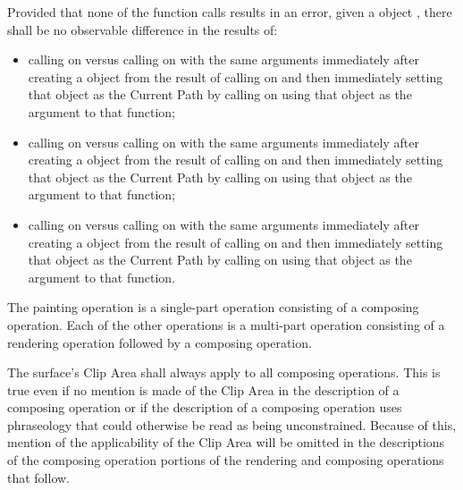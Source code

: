 \pnum
Provided that none of the function calls results in an error, given a  object , there shall be no observable difference in the results of:
\begin{itemize}
	\item calling  on  versus calling  on  with the same arguments immediately after creating a  object from the result of calling  on  and then immediately setting that  object as the Current Path by calling  on  using that  object as the argument to that function;
	
	\item calling  on  versus calling  on  with the same arguments immediately after creating a  object from the result of calling  on  and then immediately setting that  object as the Current Path by calling  on  using that  object as the argument to that function;
	
	\item calling  on  versus calling  on  with the same arguments immediately after creating a  object from the result of calling  on  and then immediately setting that  object as the Current Path by calling  on  using that  object as the argument to that function.
\end{itemize}

\pnum
The painting operation is a single-part operation consisting of a composing operation. Each of the other operations is a multi-part operation consisting of a rendering operation followed by a composing operation.

\pnum
The surface's Clip Area shall always apply to all composing operations. This is true even if no mention is made of the Clip Area in the description of a composing operation or if the description of a composing operation uses phraseology that could otherwise be read as being unconstrained.
\enternote
Because of this, mention of the applicability of the Clip Area will be omitted in the descriptions of the composing operation portions of the rendering and composing operations that follow.
\exitnote

